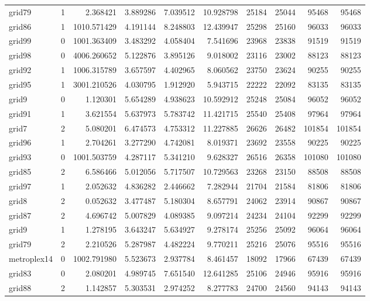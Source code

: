 \begin{longtable}{|l|r|r|r|r|r|r|r|r|r|}
grid79 & 1 & 2.368421 & 3.889286 & 7.039512 & 10.928798 & 25184 & 25044 & 95468 & 95468 \\
grid86 & 1 & 1010.571429 & 4.191144 & 8.248803 & 12.439947 & 25298 & 25160 & 96033 & 96033 \\
grid99 & 0 & 1001.363409 & 3.483292 & 4.058404 & 7.541696 & 23968 & 23838 & 91519 & 91519 \\
grid98 & 0 & 4006.260652 & 5.122876 & 3.895126 & 9.018002 & 23116 & 23002 & 88123 & 88123 \\
grid92 & 1 & 1006.315789 & 3.657597 & 4.402965 & 8.060562 & 23750 & 23624 & 90255 & 90255 \\
grid95 & 1 & 3001.210526 & 4.030795 & 1.912920 & 5.943715 & 22222 & 22092 & 83135 & 83135 \\
grid9 & 0 & 1.120301 & 5.654289 & 4.938623 & 10.592912 & 25248 & 25084 & 96052 & 96052 \\
grid91 & 1 & 3.621554 & 5.637973 & 5.783742 & 11.421715 & 25540 & 25408 & 97964 & 97964 \\
grid7 & 2 & 5.080201 & 6.474573 & 4.753312 & 11.227885 & 26626 & 26482 & 101854 & 101854 \\
grid96 & 1 & 2.704261 & 3.277290 & 4.742081 & 8.019371 & 23692 & 23558 & 90225 & 90225 \\
grid93 & 0 & 1001.503759 & 4.287117 & 5.341210 & 9.628327 & 26516 & 26358 & 101080 & 101080 \\
grid85 & 2 & 6.586466 & 5.012056 & 5.717507 & 10.729563 & 23268 & 23150 & 88508 & 88508 \\
grid97 & 1 & 2.052632 & 4.836282 & 2.446662 & 7.282944 & 21704 & 21584 & 81806 & 81806 \\
grid8 & 2 & 0.052632 & 3.477487 & 5.180304 & 8.657791 & 24062 & 23914 & 90867 & 90867 \\
grid87 & 2 & 4.696742 & 5.007829 & 4.089385 & 9.097214 & 24234 & 24104 & 92299 & 92299 \\
grid9 & 1 & 1.278195 & 3.643247 & 5.634927 & 9.278174 & 25256 & 25092 & 96064 & 96064 \\
grid79 & 2 & 2.210526 & 5.287987 & 4.482224 & 9.770211 & 25216 & 25076 & 95516 & 95516 \\
metroplex14 & 0 & 1002.791980 & 5.523673 & 2.937784 & 8.461457 & 18092 & 17966 & 67439 & 67439 \\
grid83 & 0 & 2.080201 & 4.989745 & 7.651540 & 12.641285 & 25106 & 24946 & 95916 & 95916 \\
grid88 & 2 & 1.142857 & 5.303531 & 2.974252 & 8.277783 & 24700 & 24560 & 94143 & 94143 \\

\end{longtable}
